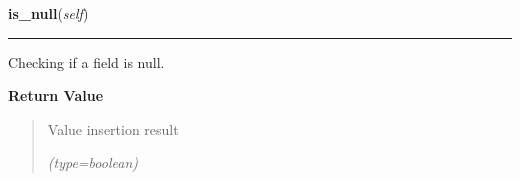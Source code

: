     \vspace{0.5ex}

\hspace{.8\funcindent}\begin{boxedminipage}{\funcwidth}

    \raggedright \textbf{is\_null}(\textit{self})

    \vspace{-1.5ex}

    \rule{\textwidth}{0.5\fboxrule}
\setlength{\parskip}{2ex}
    Checking if a field is null.

\setlength{\parskip}{1ex}
      \textbf{Return Value}
    \vspace{-1ex}

      \begin{quote}
      Value insertion result

      {\it (type=boolean)}

      \end{quote}

    \end{boxedminipage}

    \label{src:pylibratm:Field:set_value}

    \vspace{0.5ex}

